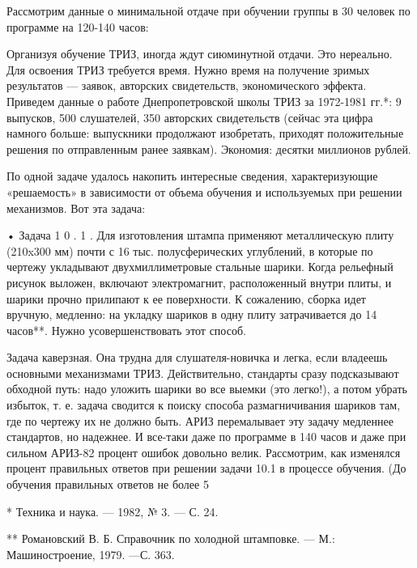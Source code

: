 Рассмотрим  данные  о минимальной  отдаче  при  обучении группы  в  30
человек по программе на 120-140 часов:



Организуя  обучение   ТРИЗ,  иногда   ждут  сиюминутной   отдачи.  Это
нереально. Для освоения ТРИЗ требуется время. Нужно время на получение
зримых  результатов —  заявок, авторских  свидетельств, экономического
эффекта.  Приведем  данные о  работе  Днепропетровской  школы ТРИЗ  за
1972-1981 гг.*: 9 выпусков, 500 слушателей, 350 авторских свидетельств
(сейчас эта  цифра намного  больше: выпускники  продолжают изобретать,
приходят  положительные   решения  по  отправленным   ранее  заявкам).
Экономия: десятки миллионов рублей.


По одной задаче удалось  накопить интересные сведения, характеризующие
«решаемость»  в  зависимости от  объема  обучения  и используемых  при
решении механизмов. Вот эта задача:

• Задача  1 0 .  1 .  Для изготовления штампа  применяют металлическую
плиту  (210x300 мм)  почти  с 16  тыс.  полусферических углублений,  в
которые  по  чертежу  укладывают  двухмиллиметровые  стальные  шарики.
Когда рельефный рисунок выложен, включают электромагнит, расположенный
внутри плиты, и шарики прочно прилипают к ее поверхности. К сожалению,
сборка  идет  вручную,  медленно:  на укладку  шариков  в  одну  плиту
затрачивается до 14 часов**. Нужно усовершенствовать этот способ.

Задача  каверзная.  Она трудна  для  слушателя-новичка  и легка,  если
владеешь  основными механизмами  ТРИЗ. Действительно,  стандарты сразу
подсказывают обходной  путь: надо  уложить шарики  во все  выемки (это
легко!),  а потом  убрать  избыток,  т. е.  задача  сводится к  поиску
способа размагничивания шариков там, где по чертежу их не должно быть.
АРИЗ  перемалывает эту  задачу  медленнее стандартов,  но надежнее.  И
все-таки даже  по программе  в 140  часов и  даже при  сильном АРИЗ-82
процент  ошибок  довольно  велик. Рассмотрим,  как  изменялся  процент
правильных ответов  при решении задачи  10.1 в процессе  обучения. (До
обучения правильных ответов не более 5%

* Техника и наука. — 1982, № 3. — С. 24.

**  Романовский  В.  Б.  Справочник   по  холодной  штамповке.  —  М.:
Машиностроение, 1979. —С. 363.


